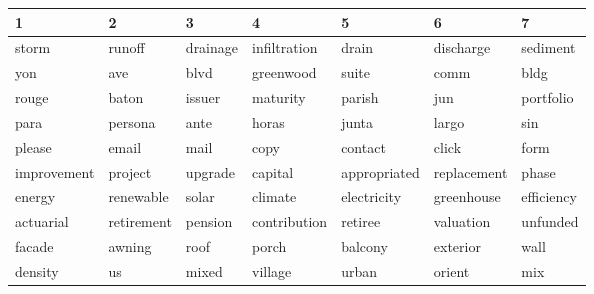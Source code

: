 \begin{table}[ht]
\centering
\begingroup\scriptsize
\begin{tabular}{lllllll}
  \hline
1 & 2 & 3 & 4 & 5 & 6 & 7 \\ 
  \hline
\cellcolor{red!10}storm & \cellcolor{red!10}runoff & \cellcolor{red!10}drainage & \cellcolor{red!10}infiltration & \cellcolor{red!10}drain & \cellcolor{red!10}discharge & \cellcolor{red!10}sediment \\ 
  \cellcolor{red!10}yon & \cellcolor{red!10}ave & \cellcolor{red!10}blvd & \cellcolor{red!10}greenwood & \cellcolor{red!10}suite & \cellcolor{red!10}comm & \cellcolor{red!10}bldg \\ 
  \cellcolor{white}rouge & \cellcolor{white}baton & \cellcolor{white}issuer & \cellcolor{white}maturity & \cellcolor{white}parish & \cellcolor{white}jun & \cellcolor{white}portfolio \\ 
  \cellcolor{red!10}para & \cellcolor{red!10}persona & \cellcolor{red!10}ante & \cellcolor{red!10}horas & \cellcolor{red!10}junta & \cellcolor{red!10}largo & \cellcolor{red!10}sin \\ 
  \cellcolor{red!30}please & \cellcolor{red!30}email & \cellcolor{red!30}mail & \cellcolor{red!30}copy & \cellcolor{red!30}contact & \cellcolor{red!30}click & \cellcolor{red!30}form \\ 
  \cellcolor{blue!10}improvement & \cellcolor{blue!10}project & \cellcolor{blue!10}upgrade & \cellcolor{blue!10}capital & \cellcolor{blue!10}appropriated & \cellcolor{blue!10}replacement & \cellcolor{blue!10}phase \\ 
  \cellcolor{red!10}energy & \cellcolor{red!10}renewable & \cellcolor{red!10}solar & \cellcolor{red!10}climate & \cellcolor{red!10}electricity & \cellcolor{red!10}greenhouse & \cellcolor{red!10}efficiency \\ 
  \cellcolor{white}actuarial & \cellcolor{white}retirement & \cellcolor{white}pension & \cellcolor{white}contribution & \cellcolor{white}retiree & \cellcolor{white}valuation & \cellcolor{white}unfunded \\ 
  \cellcolor{white}facade & \cellcolor{white}awning & \cellcolor{white}roof & \cellcolor{white}porch & \cellcolor{white}balcony & \cellcolor{white}exterior & \cellcolor{white}wall \\ 
  \cellcolor{blue!10}density & \cellcolor{blue!10}us & \cellcolor{blue!10}mixed & \cellcolor{blue!10}village & \cellcolor{blue!10}urban & \cellcolor{blue!10}orient & \cellcolor{blue!10}mix \\ 

\end{tabular}
\end{table}
